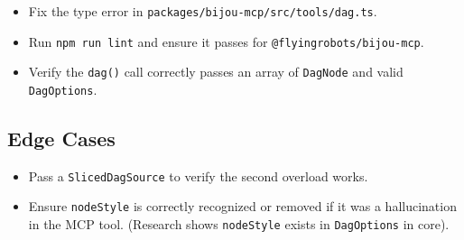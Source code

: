 \begin{itemize}
\tightlist
\item
  Fix the type error in \texttt{p\allowbreak{}a\allowbreak{}c\allowbreak{}k\allowbreak{}a\allowbreak{}g\allowbreak{}e\allowbreak{}s\allowbreak{}/\allowbreak{}b\allowbreak{}i\allowbreak{}j\allowbreak{}o\allowbreak{}u\allowbreak{}-\allowbreak{}m\allowbreak{}c\allowbreak{}p\allowbreak{}/\allowbreak{}s\allowbreak{}r\allowbreak{}c\allowbreak{}/\allowbreak{}t\allowbreak{}o\allowbreak{}o\allowbreak{}l\allowbreak{}s\allowbreak{}/\allowbreak{}d\allowbreak{}a\allowbreak{}g\allowbreak{}.\allowbreak{}t\allowbreak{}s}.
\item
  Run \texttt{n\allowbreak{}p\allowbreak{}m\allowbreak{} \allowbreak{}r\allowbreak{}u\allowbreak{}n\allowbreak{} \allowbreak{}l\allowbreak{}i\allowbreak{}n\allowbreak{}t} and ensure it passes for \texttt{@\allowbreak{}f\allowbreak{}l\allowbreak{}y\allowbreak{}i\allowbreak{}n\allowbreak{}g\allowbreak{}r\allowbreak{}o\allowbreak{}b\allowbreak{}o\allowbreak{}t\allowbreak{}s\allowbreak{}/\allowbreak{}b\allowbreak{}i\allowbreak{}j\allowbreak{}o\allowbreak{}u\allowbreak{}-\allowbreak{}m\allowbreak{}c\allowbreak{}p}.
\item
  Verify the \texttt{d\allowbreak{}a\allowbreak{}g\allowbreak{}(\allowbreak{})} call correctly passes an array of \texttt{D\allowbreak{}a\allowbreak{}g\allowbreak{}N\allowbreak{}o\allowbreak{}d\allowbreak{}e} and valid \texttt{D\allowbreak{}a\allowbreak{}g\allowbreak{}O\allowbreak{}p\allowbreak{}t\allowbreak{}i\allowbreak{}o\allowbreak{}n\allowbreak{}s}.
\end{itemize}

\subsection{Edge Cases}\label{record-251-edge-cases}

\begin{itemize}
\tightlist
\item
  Pass a \texttt{S\allowbreak{}l\allowbreak{}i\allowbreak{}c\allowbreak{}e\allowbreak{}d\allowbreak{}D\allowbreak{}a\allowbreak{}g\allowbreak{}S\allowbreak{}o\allowbreak{}u\allowbreak{}r\allowbreak{}c\allowbreak{}e} to verify the second overload works.
\item
  Ensure \texttt{n\allowbreak{}o\allowbreak{}d\allowbreak{}e\allowbreak{}S\allowbreak{}t\allowbreak{}y\allowbreak{}l\allowbreak{}e} is correctly recognized or removed if it was a hallucination in the MCP tool. (Research shows \texttt{n\allowbreak{}o\allowbreak{}d\allowbreak{}e\allowbreak{}S\allowbreak{}t\allowbreak{}y\allowbreak{}l\allowbreak{}e} exists in \texttt{D\allowbreak{}a\allowbreak{}g\allowbreak{}O\allowbreak{}p\allowbreak{}t\allowbreak{}i\allowbreak{}o\allowbreak{}n\allowbreak{}s} in core).
\end{itemize}

